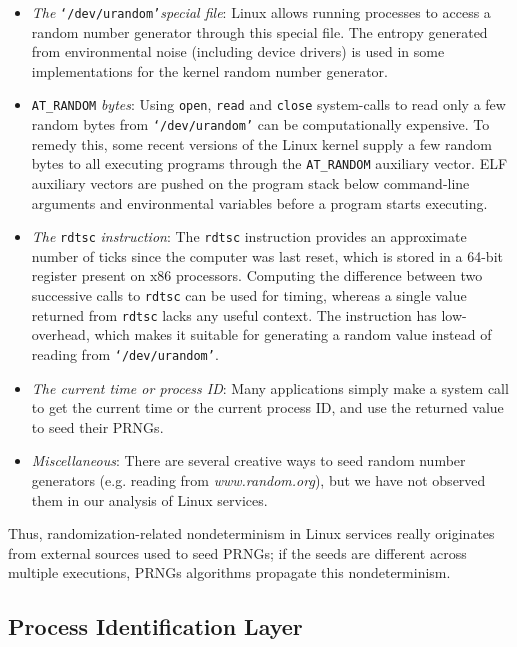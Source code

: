 \begin{itemize}
\item {\em The} \texttt{`/dev/urandom'}{\em special file}: Linux allows
running processes to access a random number generator through this
special file. The entropy generated from environmental noise (including
device drivers) is used in some implementations for the kernel random number generator.

\item \texttt{AT\_RANDOM} {\em bytes}: 
Using \texttt{open}, \texttt{read} and \texttt{close} system-calls 
to read only a few random bytes from \texttt{`/dev/urandom'} 
can be computationally expensive. 
To remedy this, some 
recent versions of the Linux kernel supply
a few random bytes to all executing programs
through the \texttt{AT\_RANDOM} auxiliary vector.
ELF auxiliary vectors are pushed on the program
stack below command-line arguments and environmental
variables before a program starts executing.

\item {\em The} \texttt{rdtsc} {\em instruction}:
The \texttt{rdtsc} instruction provides an approximate number of ticks since
the computer was last reset, which is stored in a 64-bit register present
on x86 processors. Computing the difference between two successive
calls to \texttt{rdtsc} can be used for timing, whereas a single
value returned from \texttt{rdtsc} lacks any useful context.  
The instruction has low-overhead, which makes it suitable for generating a random value
instead of reading from \texttt{`/dev/urandom'}. 

\item {\em The current time or process ID}: Many applications simply make a system call
to get the current time or the current process ID, 
and use the returned value to seed their PRNGs. 

\item {\em Miscellaneous}: There
are several creative ways to seed random number
generators (e.g. reading from {\em www.random.org}),
but we have not observed them
in our analysis of Linux services.
\end{itemize}

Thus, randomization-related nondeterminism in Linux services 
really originates from external sources used to seed PRNGs;
if the seeds are different across multiple
executions, PRNGs algorithms propagate this
nondeterminism.

\subsection{Process Identification Layer} \label{ch3:pid}

